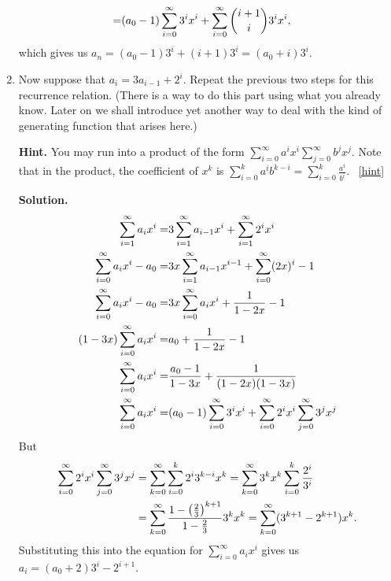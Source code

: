 \documentclass{book}
\begin{document}
\begin{activity}[]
\begin{enumerate}[font=\bfseries,label=(\alph*),ref=\alph*]
\begin{align*}
=& (a_0-1)\sum_{i=0}^\infty 3^ix^i +\sum_{i=0}^\infty \binom{i+1}{i}3^ix^i,
\end{align*}
which gives us \(a_n=(a_0-1) 3^i + (i+1)3^i=(a_0+i)3^i\).%
\item\label{task-249} \hypertarget{p-1367}{}%
Now suppose that \(a_i=3a_{i-1} + 2^i\).  Repeat the previous two steps for this recurrence relation.  (There is a way to do this part using what you already know.  Later on we shall introduce yet another way to deal with the kind of generating function that arises here.)%
\par\smallskip%
\noindent\textbf{Hint.}\hypertarget{hint-167}{}\quad%
\hypertarget{p-1368}{}%
You may run into a product of the form \(\sum_{i=0}^\infty a^ix^i\sum_{j=0}^\infty b^jx^j\). Note that in the product, the coefficient of \(x^k\) is \(\sum_{i=0}^k a^ib^{k-i} = \sum_{i=0}^k \frac{a^i}{b^i}\).%
~\hfill{\tiny\hyperlink{a-258.c}{[hint]}\hypertarget{q-258.c}{}}\par\smallskip%
\noindent\textbf{Solution.}\hypertarget{solution-170}{}\quad%
\hypertarget{p-1369}{}%
%
\begin{align*}
\sum_{i=1}^\infty a_ix^i =& 3\sum_{i=1}^\infty
a_{i-1}x^i +\sum_{i=1}^\infty 2^ix^i\\
\sum_{i=0}^\infty a_ix^i -a_0  =& 3x\sum_{i=1}^\infty a_{i-1}x^{i-1}
+\sum_{i=0}^\infty (2x)^i -1\\
\sum_{i=0}^\infty a_ix^i -a_0  =& 3x\sum_{i=0}^\infty a_ix^i +\frac{1}{1-2x} -1\\
(1-3x)\sum_{i=0}^\infty a_ix^i =& a_0 +\frac{1}{1-2x}-1\\
\sum_{i=0}^\infty a_ix^i =&  \frac{a_0-1}{1-3x}+\frac{1}{(1-2x)(1-3x)}\\
\sum_{i=0}^\infty a_ix^i =& (a_0-1)\sum_{i=0}^\infty 3^ix^i +\sum_{i=0}^\infty
2^ix^i\sum_{j=0}^\infty 3^jx^j
\end{align*}
But%
\begin{align*}
\sum_{i=0}^\infty
2^ix^i\sum_{j=0}^\infty 3^jx^j&=
\sum_{k=0}^\infty
\sum_{i=0}^k 2^i3^{k-i}x^k=
\sum_{k=0}^\infty3^kx^k
\sum_{i=0}^k \frac{2^i}{3^i}\\
&=\sum_{k=0}^\infty \frac{1-\left(\frac{2}{3}\right)^{k+1}}{1-\frac{2}{3}}3^kx^k =\sum_{k=0}^\infty
(3^{k+1}-2^{k+1})x^k\text{.}
\end{align*}
Substituting this into the equation for \(\sum_{i=0}^\infty a_ix^i\) gives us \(a_i =(a_0+2)3^i -2^{i+1}\).%
\end{enumerate}
\end{activity}
\end{document}
